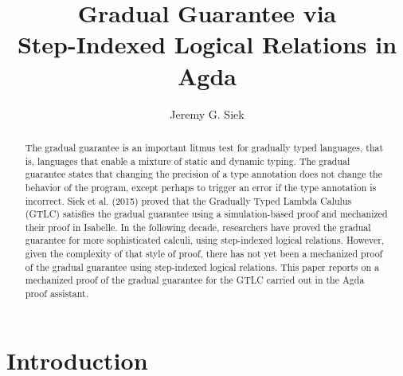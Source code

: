 \documentclass[submission,copyright,creativecommons]{eptcs}
\title{Gradual Guarantee via \\ Step-Indexed Logical Relations in Agda}
\author{Jeremy G. Siek
\institute{School of Informatics, Computing, and Engineering\\
Indiana University \\
Bloomington, IN, USA}
\email{jsiek@iu.edu}
}
\begin{document}
\maketitle

\begin{abstract}
  The gradual guarantee is an important litmus test for gradually
  typed languages, that is, languages that enable a mixture of static
  and dynamic typing. The gradual guarantee states that changing the
  precision of a type annotation does not change the behavior of the
  program, except perhaps to trigger an error if the type annotation
  is incorrect. Siek et al. (2015) proved that the Gradually Typed
  Lambda Calulus (GTLC) satisfies the gradual guarantee using a
  simulation-based proof and mechanized their proof in Isabelle. In
  the following decade, researchers have proved the gradual guarantee
  for more sophisticated calculi, using step-indexed logical
  relations.  However, given the complexity of that style of proof,
  there has not yet been a mechanized proof of the gradual guarantee
  using step-indexed logical relations. This paper reports on a
  mechanized proof of the gradual guarantee for the GTLC carried out
  in the Agda proof assistant.
\end{abstract}


\section{Introduction}

\cite{Siek:2015ac}



\clearpage






\end{document}
